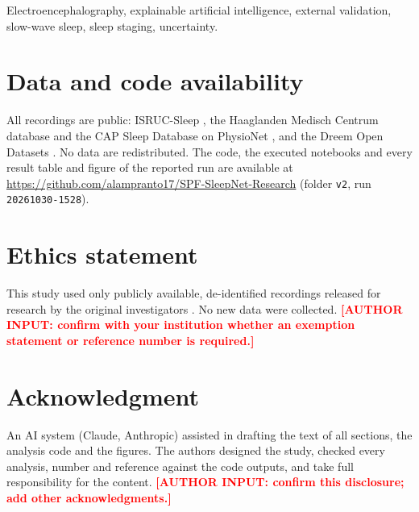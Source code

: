 \documentclass[journal]{IEEEtran}
\newcommand{\placeholder}[1]{\textbf{\textcolor{red}{[#1]}}}
\begin{document}
\begin{IEEEkeywords}
Electroencephalography, explainable artificial intelligence, external validation, slow-wave sleep, sleep staging, uncertainty.
\end{IEEEkeywords}








\section*{Data and code availability}
All recordings are public: ISRUC-Sleep \cite{khalighi2016isruc}, the Haaglanden Medisch Centrum database \cite{alvarez2022hmcdb,alvarez2021hmc} and the CAP Sleep Database \cite{terzano2001cap} on PhysioNet \cite{goldberger2000physionet}, and the Dreem Open Datasets \cite{guillot2020dod}. No data are redistributed. The code, the executed notebooks and every result table and figure of the reported run are available at \url{https://github.com/alampranto17/SPF-SleepNet-Research} (folder \texttt{v2}, run \texttt{20261030-1528}).

\section*{Ethics statement}
This study used only publicly available, de-identified recordings released for research by the original investigators \cite{khalighi2016isruc,alvarez2021hmc,guillot2020dod,terzano2001cap}. No new data were collected. \placeholder{AUTHOR INPUT: confirm with your institution whether an exemption statement or reference number is required.}

\section*{Acknowledgment}
An AI system (Claude, Anthropic) assisted in drafting the text of all sections, the analysis code and the figures. The authors designed the study, checked every analysis, number and reference against the code outputs, and take full responsibility for the content. \placeholder{AUTHOR INPUT: confirm this disclosure; add other acknowledgments.}



\end{document}
